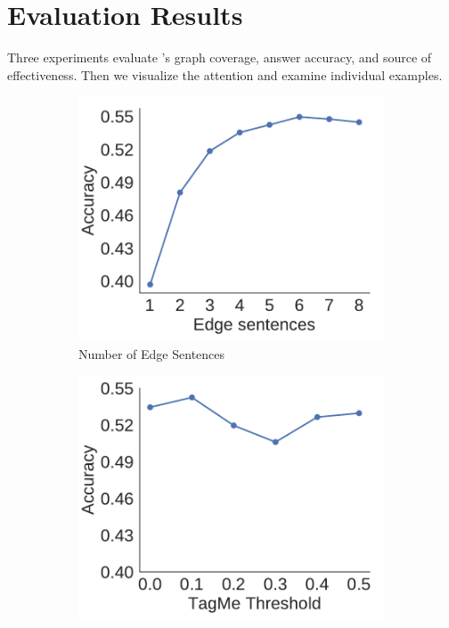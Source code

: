 
\section{Evaluation Results}
\label{sec:eva}

Three experiments evaluate \name{}'s graph coverage,
answer accuracy, and source of effectiveness. Then we visualize the
 attention and examine individual examples.


\begin{figure}[t]
\centering
\small
 \begin{subfigure}{0.3\textwidth}
        \includegraphics[width=\textwidth]{2020_www_delft/figures/EdgeAccu.pdf}
        \centering
        \caption{Number of Edge Sentences}
    \end{subfigure}
   \begin{subfigure}{0.3\textwidth}
        \includegraphics[width=\textwidth]{2020_www_delft/figures/TagmeAccu.pdf}

\end{subfigure}
\end{figure}

